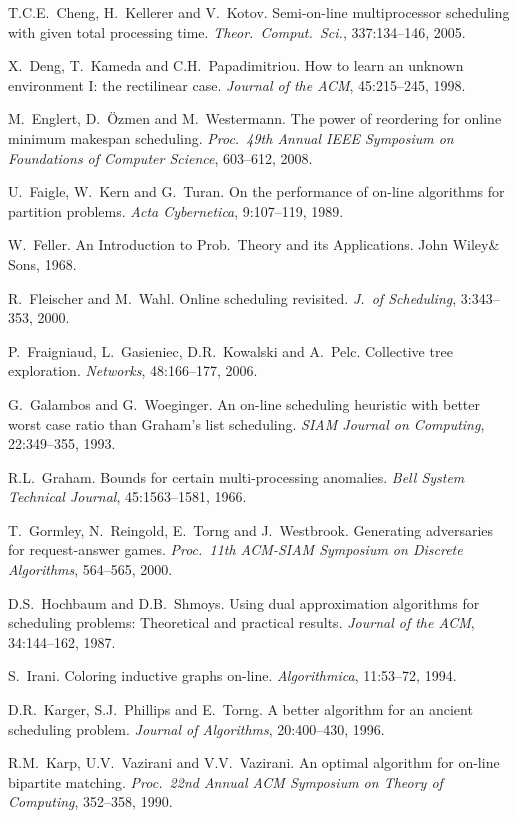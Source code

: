 \documentclass{llncs}
\begin{document}
\begin{thebibliography}{10}
T.C.E.\ Cheng, H.\ Kellerer and V.\ Kotov. Semi-on-line multiprocessor scheduling with given 
total processing time. {\em Theor.\ Comput.\ Sci.\/}, 337:134--146, 2005.

X.\ Deng, T.\ Kameda and C.H.\ Papadimitriou. How to learn an unknown environment I: the rectilinear 
case. {\em Journal of the ACM\/}, 45:215--245, 1998.

M.\ Englert, D.\ \"Ozmen and M.\ Westermann. The power of reordering for online minimum makespan scheduling. 
{\em Proc.\ 49th Annual IEEE Symposium on Foundations of Computer Science\/}, 603--612, 2008.

U.\ Faigle, W.\ Kern and G.\ Turan. On the performance of on-line
algorithms for partition problems. {\em  Acta Cybernetica}, 9:107--119,
1989.

W.\ Feller. An Introduction to Prob.\ Theory and its Applications. John Wiley\& Sons, 1968.

R.~Fleischer and M.~Wahl. Online scheduling revisited. {\em J.\ of
Scheduling}, 3:343--353, 2000.

P.\ Fraigniaud, L.\ Gasieniec, D.R.\ Kowalski and A.\ Pelc. Collective tree exploration. 
{\em Networks\/}, 48:166--177, 2006.

G.\ Galambos and G.\ Woeginger. An on-line scheduling heuristic with 
better worst case ratio than Graham's list scheduling. {\em SIAM
Journal on Computing}, 22:349--355, 1993.

R.L.\ Graham. Bounds for certain multi-processing anomalies.
{\em Bell System Technical Journal}, 45:1563--1581, 1966.

T.~Gormley, N.~Reingold, E.~Torng and J.~Westbrook. Generating
adversaries for request-answer games. {\em Proc.\ 11th ACM-SIAM
Symposium on Discrete Algorithms\/}, 564--565, 2000.

D.S.\ Hochbaum and D.B.\ Shmoys. Using dual approximation algorithms for scheduling problems:
Theoretical and practical results. {\em Journal of the ACM\/}, 34:144--162, 1987.

S.\ Irani. Coloring inductive graphs on-line. {\em Algorithmica\/},  11:53--72, 1994.

D.R.~Karger, S.J.~Phillips and E.~Torng. A better algorithm for an
ancient scheduling problem. {\em Journal of Algorithms}, 20:400--430, 1996.

R.M.\ Karp, U.V.\ Vazirani and V.V.\ Vazirani. An optimal algorithm for on-line bipartite matching. 
{\em Proc.\ 22nd Annual ACM Symposium on Theory of Computing\/}, 352--358, 1990.


\end{thebibliography}
\end{document}
